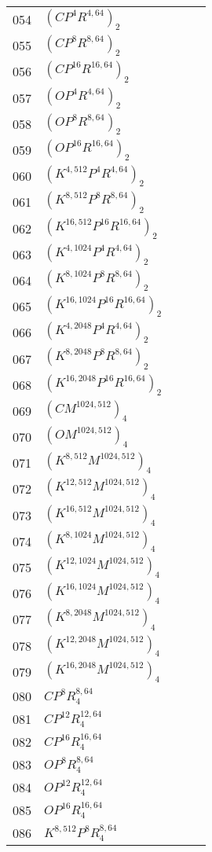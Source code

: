 \begin{appendices}
\begin{table*}
\begin{tabular}{|l | l | l | l }
		054&$(CP^4R^{4,64})_2$ &~&~\\
		055&$(CP^{8}R^{8,64})_2$ &~&~\\
		056&$(CP^{16}R^{16,64})_2$ &~&~\\
		057&$(OP^4R^{4,64})_2$ &~&~\\
		058&$(OP^{8}R^{8,64})_2$ &~&~\\
		059&$(OP^{16}R^{16,64})_2$ &~&~\\
		060&$(K^{4,512}P^{4}R^{4,64})_2$ &~&~\\
		061&$(K^{8,512}P^{8}R^{8,64})_2$ &~&~\\
		062&$(K^{16,512}P^{16}R^{16,64})_2$ &~&~\\
		063&$(K^{4,1024}P^{4}R^{4,64})_2$ &~&~\\
		064&$(K^{8,1024}P^{8}R^{8,64})_2$ &~&~\\
		065&$(K^{16,1024}P^{16}R^{16,64})_2$ &~&~\\
		066&$(K^{4,2048}P^{4}R^{4,64})_2$ &~&~\\
		067&$(K^{8,2048}P^{8}R^{8,64})_2$ &~&~\\
		068&$(K^{16,2048}P^{16}R^{16,64})_2$ &~&~\\
		\hline
		069&$(CM^{1024,512})_4$ &~&~\\
		070&$(OM^{1024,512})_4$ &~&~\\
		071&$(K^{8,512}M^{1024,512})_4$ &~&~\\
		072&$(K^{12,512}M^{1024,512})_4$ &~&~\\
		073&$(K^{16,512}M^{1024,512})_4$ &~&~\\
		074&$(K^{8,1024}M^{1024,512})_4$ &~&~\\
		075&$(K^{12,1024}M^{1024,512})_4$ &~&~\\
		076&$(K^{16,1024}M^{1024,512})_4$ &~&~\\
		077&$(K^{8,2048}M^{1024,512})_4$ &~&~\\
		078&$(K^{12,2048}M^{1024,512})_4$ &~&~\\
		079&$(K^{16,2048}M^{1024,512})_4$ &~&~\\
		080&$CP^8R^{8,64}_4$ &~&~\\
		081&$CP^{12}R^{12,64}_4$ &~&~\\
		082&$CP^{16}R^{16,64}_4$ &~&~\\
		083&$OP^8R^{8,64}_4$ &~&~\\
		084&$OP^{12}R^{12,64}_4$ &~&~\\
		085&$OP^{16}R^{16,64}_4$ &~&~\\
		086&$K^{8,512}P^{8}R^{8,64}_4$ &~&~\\

\end{tabular}
\end{table*}
\end{appendices}
